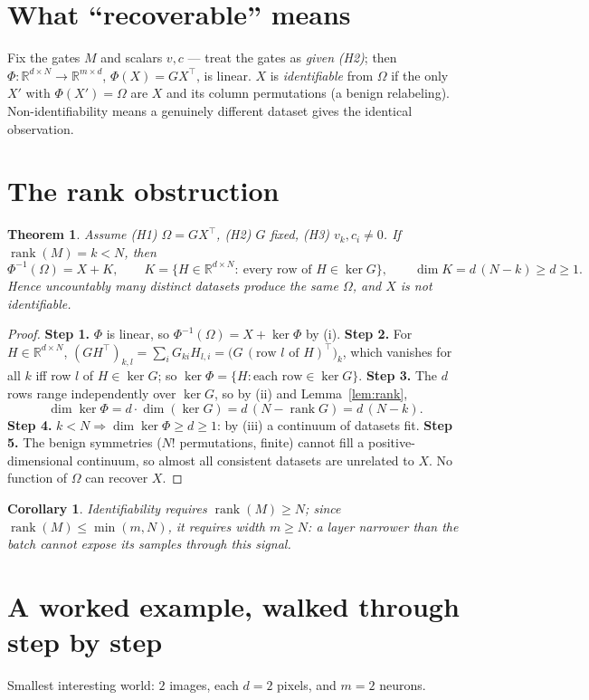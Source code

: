 \documentclass[11pt]{article}
\newtheorem{theorem}{Theorem}
\newtheorem{corollary}{Corollary}
\theoremstyle{definition}
\newcommand{\R}{\mathbb{R}}
\newcommand{\rank}{\operatorname{rank}}
\newcommand{\Om}{\Omega}
\begin{document}
\section{What ``recoverable'' means}
Fix the gates $M$ and scalars $v,c$ --- treat the gates as \emph{given} \emph{(H2)}; then
$\Phi:\R^{d\times N}\to\R^{m\times d}$, $\Phi(X)=GX^\top$, is linear. $X$ is
\emph{identifiable} from $\Om$ if the only $X'$ with $\Phi(X')=\Om$ are $X$ and its column
permutations (a benign relabeling). Non-identifiability means a genuinely different dataset gives
the identical observation.

\section{The rank obstruction}
\begin{theorem}\label{thm:main}
Assume \emph{(H1)} $\Om=GX^\top$, \emph{(H2)} $G$ fixed, \emph{(H3)} $v_k,c_i\neq0$. If
$\rank(M)=k<N$, then
\[
\Phi^{-1}(\Om)=X+K,\qquad K=\{H\in\R^{d\times N}:\ \text{every row of }H\in\ker G\},\qquad
\dim K=d\,(N-k)\ge d\ge1 .
\]
Hence uncountably many distinct datasets produce the same $\Om$, and $X$ is not identifiable.
\end{theorem}
\begin{proof}
\textbf{Step 1.} $\Phi$ is linear, so $\Phi^{-1}(\Om)=X+\ker\Phi$ by (i).
\textbf{Step 2.} For $H\in\R^{d\times N}$,
$(GH^\top)_{k,l}=\sum_i G_{ki}H_{l,i}=\big(G\,(\text{row }l\text{ of }H)^\top\big)_k$, which
vanishes for all $k$ iff row $l$ of $H\in\ker G$; so $\ker\Phi=\{H:\text{each row}\in\ker G\}$.
\textbf{Step 3.} The $d$ rows range independently over $\ker G$, so by (ii) and
Lemma~\ref{lem:rank},
\[
\dim\ker\Phi=d\cdot\dim(\ker G)=d\,(N-\rank G)=d\,(N-k).
\]
\textbf{Step 4.} $k<N\Rightarrow\dim\ker\Phi\ge d\ge1$: by (iii) a continuum of datasets fit.
\textbf{Step 5.} The benign symmetries ($N!$ permutations, finite) cannot fill a
positive-dimensional continuum, so almost all consistent datasets are unrelated to $X$. No
function of $\Om$ can recover $X$.
\end{proof}

\begin{corollary}
Identifiability requires $\rank(M)\ge N$; since $\rank(M)\le\min(m,N)$, it requires width
$m\ge N$: a layer narrower than the batch cannot expose its samples through this signal.
\end{corollary}

\section{A worked example, walked through step by step}\label{sec:example}
Smallest interesting world: $2$ images, each $d=2$ pixels, and $m=2$ neurons.
\end{document}
